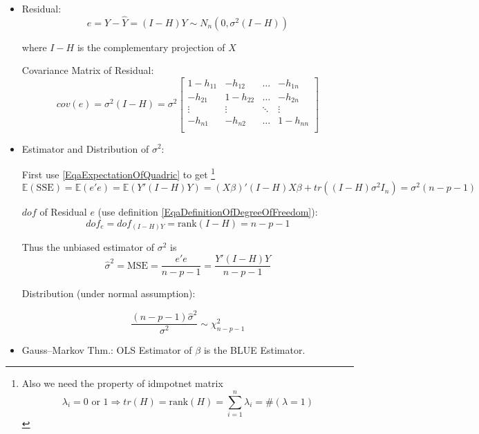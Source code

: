 \begin{itemize}[topsep=2pt,itemsep=2pt]
    \item Residual:
    \begin{equation}\label{EqaMatrixNotationOfResidual}
        e=Y-\hat{Y}=(I-H)Y\sim N_n\left(0 , \sigma ^2(I-H) \right)
    \end{equation}

    where $ I-H $ is the complementary projection of $ X $

    Covariance Matrix of Residual:
    \begin{equation}
        cov(e)=\sigma ^2(I-H)=
        \sigma ^2\begin{bmatrix}
        1-h_{11}&-h_{12}&\ldots&-h_{1n}\\
        -h_{21}&1-h_{22}&\ldots&-h_{2n}\\
        \vdots&\vdots&\ddots&\vdots\\
        -h_{n1}&-h_{n2}&\ldots&1-h_{nn}\\
        \end{bmatrix}
    \end{equation}
    
    
    \item Estimator and Distribution of  $ \sigma ^2 $:
    
    First use \autoref{EqaExpectationOfQuadric} to get \footnote{Also we need the property of idmpotnet matrix
    \begin{equation}
        \lambda_i=0\text{ or }1\Rightarrow tr(H)=\mathrm{rank}(H)=\sum_{i=1}^n\lambda _i=\# (\lambda =1) 
    \end{equation}
    }
    \begin{equation}\label{EqaExpectationOfSSE}
        \mathbb{E}(\mathrm{SSE})=\mathbb{E}(e'e)=\mathbb{E}(Y'(I-H)Y)=(X\beta )'(I-H)X\beta +tr((I-H)\sigma ^2I_n) =\sigma ^2(n-p-1)
    \end{equation}

    $ dof $ of Residual $ e $ (use definition \autoref{EqaDefinitionOfDegreeOfFreedom}):
    \begin{equation}
        dof_e=dof_{(I-H)Y}=\mathrm{rank}(I-H)=n-p-1 
    \end{equation}
    
    
    
    Thus the unbiased estimator of $ \sigma ^2 $ is 
    \begin{equation}
        \hat{\sigma }^2=\mathrm{MSE}=\dfrac{e'e}{n-p-1}=\dfrac{Y'(I-H)Y}{n-p-1}
    \end{equation}

    Distribution (under normal assumption):
    
    \begin{equation}\label{EqaDistributionOfMultiVariateSigma}
        \dfrac{(n-p-1)\hat{\sigma }^2}{\sigma ^2}\sim \chi^2_{n-p-1}
    \end{equation}
    
    \item Gauss–Markov Thm.: OLS Estimator of $ \beta  $ is the BLUE Estimator.
\end{itemize}

